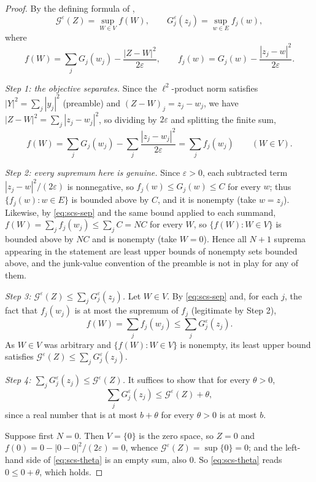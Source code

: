 \begin{proof}
By the defining formula of ,
\[
  \mathcal G^\varepsilon(Z)=\sup_{W\in V}f(W),
  \qquad
  G_j^\varepsilon(z_j)=\sup_{w\in E}f_j(w),
\]
where
\[
  f(W)=\sum_jG_j(w_j)-\frac{|Z-W|^2}{2\varepsilon},
  \qquad
  f_j(w)=G_j(w)-\frac{|z_j-w|^2}{2\varepsilon}.
\]

\emph{Step 1: the objective separates.}
Since the $\ell^2$-product norm satisfies $|Y|^2=\sum_j|y_j|^2$ (preamble) and
$(Z-W)_j=z_j-w_j$, we have $|Z-W|^2=\sum_j|z_j-w_j|^2$, so dividing by
$2\varepsilon$ and splitting the finite sum,
\begin{equation}\label{eq:scs-sep}
  f(W)=\sum_jG_j(w_j)-\sum_j\frac{|z_j-w_j|^2}{2\varepsilon}
   =\sum_jf_j(w_j)\qquad(W\in V).
\end{equation}

\emph{Step 2: every supremum here is genuine.}
Since $\varepsilon>0$, each subtracted term $|z_j-w|^2/(2\varepsilon)$ is
nonnegative, so $f_j(w)\le G_j(w)\le C$ for every $w$; thus
$\{f_j(w):w\in E\}$ is bounded above by $C$, and it is nonempty (take $w=z_j$).
Likewise, by \eqref{eq:scs-sep} and the same bound applied to each summand,
$f(W)=\sum_jf_j(w_j)\le\sum_jC=NC$ for every $W$, so $\{f(W):W\in V\}$ is
bounded above by $NC$ and is nonempty (take $W=0$). Hence all $N+1$ suprema
appearing in the statement are least upper bounds of nonempty sets bounded
above, and the junk-value convention of the preamble is not in play for any of
them.

\emph{Step 3: $\mathcal G^\varepsilon(Z)\le\sum_jG_j^\varepsilon(z_j)$.}
Let $W\in V$. By \eqref{eq:scs-sep} and, for each $j$, the fact that $f_j(w_j)$
is at most the supremum of $f_j$ (legitimate by Step 2),
\[
  f(W)=\sum_jf_j(w_j)\le\sum_jG_j^\varepsilon(z_j).
\]
As $W\in V$ was arbitrary and $\{f(W):W\in V\}$ is nonempty, its least upper
bound satisfies $\mathcal G^\varepsilon(Z)\le\sum_jG_j^\varepsilon(z_j)$.

\emph{Step 4: $\sum_jG_j^\varepsilon(z_j)\le\mathcal G^\varepsilon(Z)$.}
It suffices to show that for every $\theta>0$,
\begin{equation}\label{eq:scs-theta}
  \sum_jG_j^\varepsilon(z_j)\le\mathcal G^\varepsilon(Z)+\theta ,
\end{equation}
since a real number that is at most $b+\theta$ for every $\theta>0$ is at most
$b$.

Suppose first $N=0$. Then $V=\{0\}$ is the zero space, so $Z=0$ and
$f(0)=0-|0-0|^2/(2\varepsilon)=0$, whence
$\mathcal G^\varepsilon(Z)=\sup\{0\}=0$; and the left-hand side of
\eqref{eq:scs-theta} is an empty sum, also $0$. So \eqref{eq:scs-theta} reads
$0\le0+\theta$, which holds.


\end{proof}
